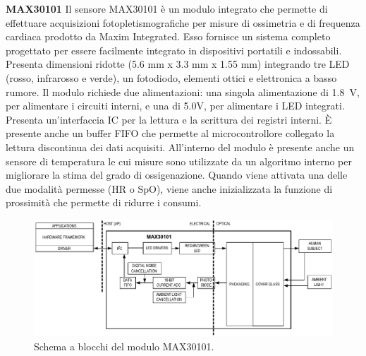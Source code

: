 \textbf{MAX30101} Il sensore MAX30101 è un modulo integrato che permette di effettuare acquisizioni fotopletismografiche per misure di ossimetria e di frequenza cardiaca prodotto da Maxim Integrated\cite{IntegratedMAX30101}. Esso fornisce un sistema completo progettato per essere facilmente integrato in dispositivi portatili e indossabili. Presenta dimensioni ridotte (5.6 mm x 3.3 mm x 1.55 mm) integrando tre LED (rosso, infrarosso e verde), un fotodiodo, elementi ottici e elettronica a basso rumore. Il modulo richiede due alimentazioni: una singola alimentazione di \SI{1.8}{\volt}, per alimentare i circuiti interni, e una di 5.0V, per alimentare i LED integrati. Presenta un'interfaccia IC per la lettura e la scrittura dei registri interni. \`E presente anche un buffer FIFO che permette al microcontrollore collegato la lettura discontinua dei dati acquisiti. All'interno del modulo è presente anche un sensore di temperatura le cui misure sono utilizzate da un algoritmo interno per migliorare la stima del grado di ossigenazione. Quando viene attivata una delle due modalità permesse (HR o SpO), viene anche inizializzata la funzione di prossimità che permette di ridurre i consumi.   
\begin{figure}[tb]
	\centering
	\includegraphics[width=1\linewidth]{ImageFiles/Fotopletismografia/MAX30101BlockDiagram}
	\caption{Schema a blocchi del modulo MAX30101.}
	\label{fig:MAX30101BlockDiagram}
\end{figure}

\pagebreak

